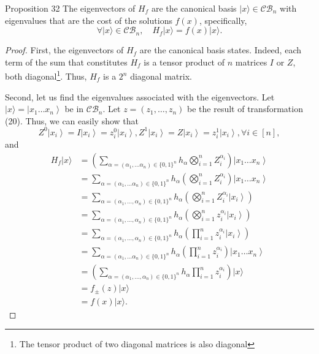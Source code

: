 \begin{proposition}
    Proposition 32 The eigenvectors of $H_{f}$ are the canonical basis $|x\rangle \in \mathcal{C B}_{n}$ with eigenvalues that are the cost of the solutions $f(x)$, specifically,
\begin{equation*}
\forall|x\rangle \in \mathcal{C B}_{n}, \quad H_{f}|x\rangle=f(x)|x\rangle. \tag{21}
\end{equation*}
\end{proposition}
\begin{proof}
    First, the eigenvectors of $H_{f}$ are the canonical basis states. Indeed, each term of the sum that constitutes $H_{f}$ is a tensor product of $n$ matrices $I$ or $Z$, both diagonal\footnote{The tensor product of two diagonal matrices is also diagonal}. Thus, $H_{f}$ is a $2^{n}$ diagonal matrix. 
    
    Second, let us find the eigenvalues associated with the eigenvectors. Let $|x\rangle=\left|x_{1} \ldots x_{n}\right\rangle$ be in $\mathcal{C B}_{n}$. Let $z=\left(z_{1}, \ldots, z_{n}\right)$ be the result of transformation (20). Thus, we can easily show that $$
Z^{0}\left|x_{i}\right\rangle=I\left|x_{i}\right\rangle=z_{i}^{0}\left|x_{i}\right\rangle,Z^{1}\left|x_{i}\right\rangle=Z\left|x_{i}\right\rangle=z_{i}^{1}\left|x_{i}\right\rangle, \forall i \in[n],
$$
and
$$
\begin{aligned}
H_{f}|x\rangle 
& =\left(\sum_{\alpha=\left(\alpha_{1}, \ldots \alpha_{n}\right) \in\{0,1\}^{n}} h_{\alpha} \bigotimes_{i=1}^{n} Z_{i}^{\alpha_{i}}\right) \left|x_{1} \ldots x_{n}\right\rangle\\
& =\sum_{\alpha=\left(\alpha_{1}, \ldots \alpha_{n}\right) \in\{0,1\}^{n}} h_{\alpha} \left(\bigotimes_{i=1}^{n} Z_{i}^{\alpha_{i}}\right) \left|x_{1} \ldots x_{n}\right\rangle\\
& =\sum_{\alpha=\left(\alpha_{1}, \ldots, \alpha_{n}\right) \in\{0,1\}^{n}} h_{\alpha} \left( \bigotimes_{i=1}^{n} Z_{i}^{\alpha_{i}}\left|x_{i}\right\rangle\right) \\
& =\sum_{\alpha=\left(\alpha_{1}, \ldots, \alpha_{n}\right) \in\{0,1\}^{n}} h_{\alpha} \left(\bigotimes_{i=1}^{n} z_{i}^{\alpha_{i}}\left|x_{i}\right\rangle\right) \\
& =\sum_{\alpha=\left(\alpha_{1}, \ldots, \alpha_{n}\right) \in\{0,1\}^{n}} h_{\alpha} \left(\prod_{i=1}^{n} z_{i}^{\alpha_{i}}\left|x_{i}\right\rangle\right) \\
& =\sum_{\alpha=\left(\alpha_{1}, \ldots \alpha_{n}\right) \in\{0,1\}^{n}} h_{\alpha} \left(\prod_{i=1}^{n} z_{i}^{\alpha_{i}}\right) \left|x_{1} \ldots x_{n}\right\rangle\\
& =\left(\sum_{\alpha=\left(\alpha_{1}, \ldots, \alpha_{n}\right) \in\{0,1\}^{n}} h_{\alpha} \prod_{i=1}^{n} z_{i}^{\alpha_{i}}\right)|x\rangle \\
& =f_{ \pm}(z)|x\rangle \\
& =f(x)|x\rangle .
\end{aligned}
$$
\end{proof}
